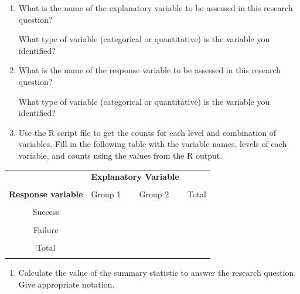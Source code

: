 \documentclass[
]{report}
\providecommand{\tightlist}{%
  \setlength{\itemsep}{0pt}\setlength{\parskip}{0pt}}
\begin{document}
\begin{enumerate}
\def\labelenumi{\alph{enumi}.}
\item
  What is the name of the explanatory variable to be assessed in this research question?
  \vspace{0.3in}

  What type of variable (categorical or quantitative) is the variable you identified?
  \vspace{0.3in}
\item
  What is the name of the response variable to be assessed in this research question?
  \vspace{0.3in}

  What type of variable (categorical or quantitative) is the variable you identified?
  \vspace{0.3in}
\item
  Use the R script file to get the counts for each level and combination of variables. Fill in the following table with the variable names, levels of each variable, and counts using the values from the R output.
\end{enumerate}

\begingroup
\setlength{\tabcolsep}{14pt}
\renewcommand{\arraystretch}{2}
\begin{center}
\begin{tabular}{|c|p{1in}|p{1in}|p{1in}|}
\hline
 & \multicolumn{2}{|c|}{\textbf{Explanatory Variable}} & \\ 
 & \multicolumn{2}{|c|}{ } & \\ \hline
\textbf{Response variable} & Group 1 & Group 2 & Total \\
 & & & \\ \hline
 Success & & & \\
 & & & \\ \hline
 Failure & & & \\
 & & & \\ \hline
 Total & & & \\
 & & & \\ \hline
\end{tabular}
\end{center}
\endgroup

\begin{enumerate}
\def\labelenumi{\alph{enumi}.}
\setcounter{enumi}{3}
\tightlist
\item
  Calculate the value of the summary statistic to answer the research question. Give appropriate notation.
\end{enumerate}
\end{document}
